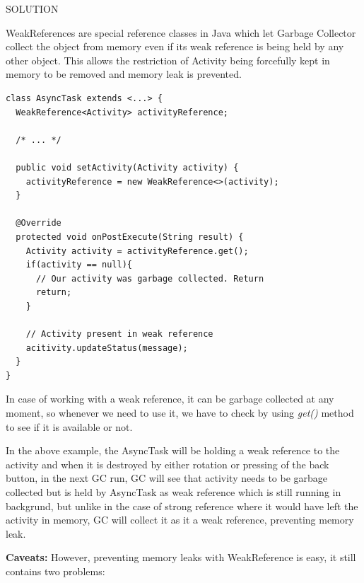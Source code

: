 \documentclass[journal]{IEEEtran}
\begin{document}
\newpage

\begin{center}
	SOLUTION
\end{center}

WeakReferences \cite{weak} are special reference classes in Java which let Garbage Collector collect the object from memory even if its weak reference is being held by any other object. This allows the restriction of Activity being forcefully kept in memory to be removed and memory leak is prevented.

\begin{verbatim}
class AsyncTask extends <...> {
  WeakReference<Activity> activityReference;
  
  /* ... */
  
  public void setActivity(Activity activity) {
    activityReference = new WeakReference<>(activity);
  }
  
  @Override
  protected void onPostExecute(String result) {
    Activity activity = activityReference.get();
    if(activity == null){
      // Our activity was garbage collected. Return
      return;
    }
    
    // Activity present in weak reference
    acitivity.updateStatus(message);
  }
}
\end{verbatim}

In case of working with a weak reference, it can be garbage collected at any moment, so whenever we need to use it, we have to check by using \textit{get()} method to see if it is available or not.

In the above example, the AsyncTask will be holding a weak reference to the activity and when it is destroyed by either rotation or pressing of the back button, in the next GC run, GC will see that activity needs to be garbage collected but is held by AsyncTask as weak reference which is still running in backgrund, but unlike in the case of strong reference where it would have left the activity in memory, GC will collect it as it a weak reference, preventing memory leak.

\textbf{Caveats:} However, preventing memory leaks with WeakReference is easy, it still contains two problems:
\end{document}
